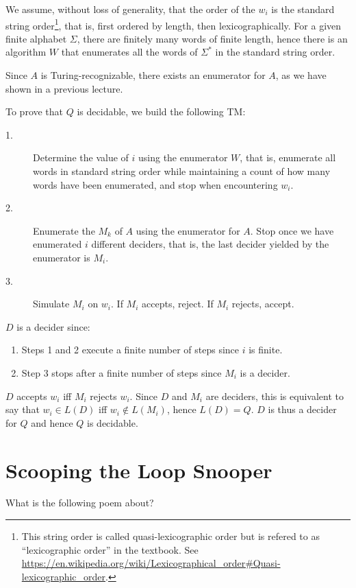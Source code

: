 \documentclass{article}
\makeatletter
\newcommand{\TM}{TM}
\newenvironment{steps}%
{%
\vspace{0.25cm}%
\begin{adjustwidth}{0.3cm}{0cm}%
\begin{description}%
}
{%
\end{description}%
\end{adjustwidth}%
\vspace{0.1cm}%
}
\newcounter{TMachine}[section]
\newenvironment{TMachine}[1]
  {\refstepcounter{TMachine}%
   \par%
   \vspace{.5\baselineskip\@plus.2\baselineskip\@minus.2\baselineskip}%
   \noindent{#1}%
   \begin{steps}}%
  {\end{steps}%
\vspace{.5\baselineskip\@plus.2\baselineskip\@minus.2\baselineskip}%
}%
\makeatother
\begin{document}
We assume,
without loss of generality, that the order of the \(w_i\) is the standard
string order\footnote{%
This string order is called quasi-lexicographic order but is refered to as
``lexicographic order'' in the textbook. See
\url{https://en.wikipedia.org/wiki/Lexicographical\_order\#Quasi-lexicographic\_order}.
}, that is, first ordered by length, then lexicographically.
For a given finite alphabet \(\Sigma\), there are finitely many words of finite
length, hence there is an algorithm \(W\) that enumerates all the words of \(\Sigma^*\)
in the standard string order.

Since \(A\) is Turing-recognizable, there exists an enumerator
for \(A\), as we have shown in a previous lecture.

To prove that \(Q\) is decidable, we build the following \TM{}:

\begin{TMachine}{\(D =\) on input \(w_i\):}
\item[1.] Determine the value of \(i\) using the enumerator \(W\), that is,
enumerate all words in standard string order while maintaining a count of how
many words have been enumerated, and stop when encountering \(w_i\).
\item[2.] Enumerate the \(M_k\) of \(A\) using the enumerator for \(A\). Stop once
we have enumerated \(i\) different deciders, that is, the last decider yielded
by the enumerator is \(M_i\).
\item[3.] Simulate \(M_i\) on \(w_i\). If \(M_i\) accepts, reject. If \(M_i\) rejects, accept.
\end{TMachine}

\(D\) is a decider since:
\begin{enumerate}
\item Steps 1 and 2 execute a finite number of steps since \(i\) is finite.
\item Step 3 stops after a finite number of steps since \(M_i\) is a decider.
\end{enumerate}

\(D\) accepts \(w_i\) iff \(M_i\) rejects \(w_i\). Since \(D\) and \(M_i\) are
deciders, this is equivalent to say
that \(w_i \in L(D)\) iff \(w_i \not\in L(M_i)\), hence \(L(D) = Q\).
\(D\) is thus a decider for \(Q\) and hence \(Q\) is decidable.

\section{Scooping the Loop Snooper}
What is the following poem about?
\end{document}
